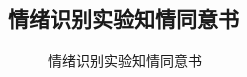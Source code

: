 \cleardoublepage

{

    \appendixsubsecmajornumbering

    \subsection{情绪识别实验知情同意书}

    \begin{figure}[htb]
        \centering
        \setlength{\abovecaptionskip}{3em}
        \caption{情绪识别实验知情同意书}
        \label{fig:informed-consent}
    \end{figure}

}